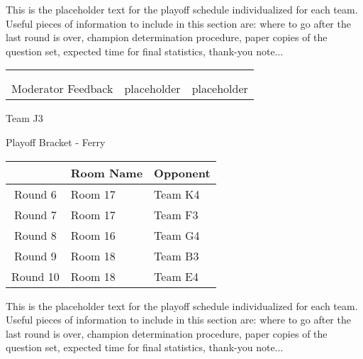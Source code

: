 \documentclass{article}%
\begin{document}
\vspace*{30pt}%
\linebreak%
This is the placeholder text for the playoff schedule individualized for each team. Useful pieces of information to include in this section are: where to go after the last round is over, champion determination procedure, paper copies of the question set, expected time for final statistics, thank{-}you note...%
\vspace*{30pt}%
\newline%
%
\begin{tabularx}{\textwidth}{YYY}%
  &  &  \\%
\\%
Moderator Feedback&placeholder&placeholder\\%
\end{tabularx}%
\newpage%
\begin{center}%
\begin{Huge}%
Team J3%
\end{Huge}%
\vspace*{12pt}%
\linebreak%
\begin{Large}%
Playoff Bracket {-} Ferry%
\end{Large}%
\end{center}%
\vspace*{4pt}%
%
\begin{tabularx}{\textwidth}{|c|Y|Y|}%
\hline%
&Room Name&Opponent\\%
\hline%
Round 6&Room 17&Team K4\\%
Round 7&Room 17&Team F3\\%
Round 8&Room 16&Team G4\\%
Round 9&Room 18&Team B3\\%
Round 10&Room 18&Team E4\\%
\hline%
\end{tabularx}%
\vspace*{30pt}%
\linebreak%
This is the placeholder text for the playoff schedule individualized for each team. Useful pieces of information to include in this section are: where to go after the last round is over, champion determination procedure, paper copies of the question set, expected time for final statistics, thank{-}you note...%
\vspace*{30pt}%
\end{document}
